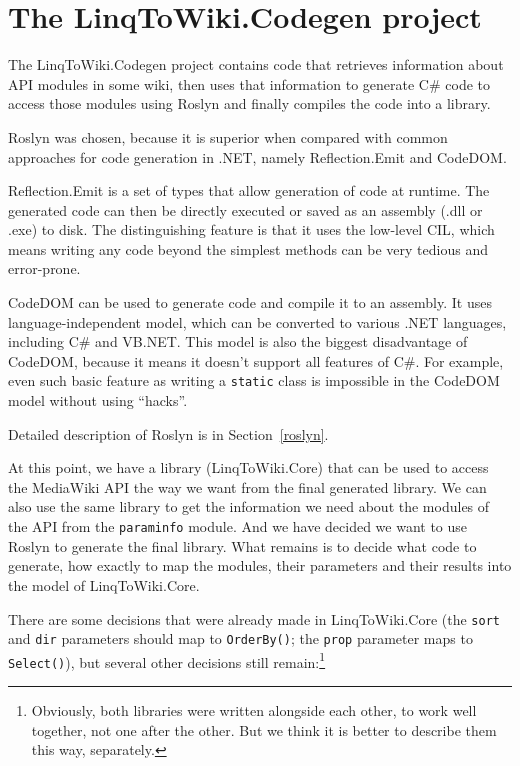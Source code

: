 \section{The LinqToWiki.Codegen project}
\label{ltwc}

The LinqToWiki.Codegen project contains code that retrieves information about \ac{API} modules in some wiki,
then uses that information to generate C\# code to access those modules using Roslyn
and finally compiles the code into a library.

\medskip

Roslyn was chosen, because it is superior when compared with common approaches for code generation in .NET,
namely Reflection.Emit and \acs{CodeDOM}.

Reflection.Emit \cite{reflection-emit} is a set of types that allow generation of code at runtime.
The generated code can then be directly executed or saved as an assembly (.dll or .exe) to disk.
The distinguishing feature is that it uses the low-level \ac{CIL},
which means writing any code beyond the simplest methods can be very tedious and error-prone.

\acs{CodeDOM} \cite{codedom} can be used to generate code and compile it to an assembly.
It uses language-independent model, which can be converted to various .NET languages,
including C\# and \ac{VB.NET}.
This model is also the biggest disadvantage of \acs{CodeDOM}, because it means it doesn't support all features of C\#.
For example, even such basic feature as writing a \lstinline{static} class is impossible in the \acs{CodeDOM} model
without using “hacks”.

Detailed description of Roslyn is in Section~\ref{roslyn}.

\medskip

At this point, we have a library (LinqToWiki.Core) that can be used to access the MediaWiki \ac{API} the way we want
from the final generated library.
We can also use the same library to get the information we need about the modules of the \ac{API} from the \texttt{paraminfo} module.
And we have decided we want to use Roslyn to generate the final library.
What remains is to decide what code to generate, how exactly to map the modules, their parameters
and their results into the model of LinqToWiki.Core.


There are some decisions that were already made in LinqToWiki.Core
(the \texttt{sort} and \texttt{dir} parameters should map to \lstinline{OrderBy()};
the \texttt{prop} parameter maps to \lstinline{Select()}),
but several other decisions still remain:\footnote{
Obviously, both libraries were written alongside each other, to work well together, not one after the other.
But we think it is better to describe them this way, separately.}

